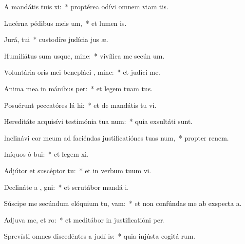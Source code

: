 \item A mandátis tuis xi:~* proptérea odívi omnem viam tis.
\item Lucérna pédibus meis  um,~* et lumen  is.
\item Jurá,  tui~* custodíre judícia jus æ.
\item Humiliátus sum usque, mine:~* vivífica me secún  um.
\item Voluntária oris mei benepláci , mine:~* et judíci   me.
\item Anima mea in mánibus  per:~* et legem tuam   tus.
\item Posuérunt peccatóres lá hi:~* et de mandátis tu  vi.
\item Hereditáte acquisívi testimónia tua  num:~* quia exsultáti   sunt.
\item Inclinávi cor meum ad faciéndas justificatiónes tuas  num,~* propter renem.
\item Iníquos ó bui:~* et legem  xi.
\item Adjútor et suscéptor   tu:~* et in verbum tuum vi.
\item Declináte a , gni:~* et scrutábor mandá  i.
\item Súscipe me secúndum elóquium tu,  vam:~* et non confúndas me ab exspecta a.
\item Adjuva me, et  ro:~* et meditábor in justificatióni  per.
\item Sprevísti omnes discedéntes a judí is:~* quia injústa cogitá rum.
